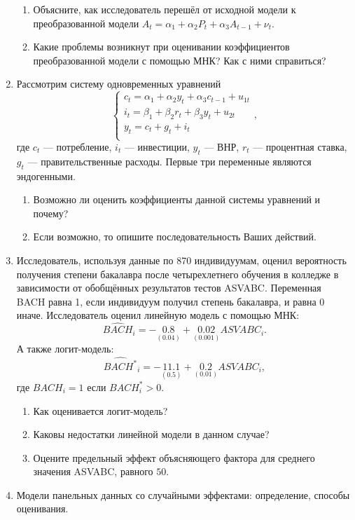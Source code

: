 \documentclass[12pt, a4paper]{article}
\theoremstyle{definition}
\begin{document}
\begin{enumerate}
\begin{enumerate}
\item Объясните, как исследователь перешёл от исходной модели к преобразованной модели $A_t = \alpha_1 + \alpha_2 P_t + \alpha_3 A_{t-1} + \nu_t$.
\item Какие проблемы возникнут при оценивании коэффициентов преобразованной модели с помощью МНК? Как с ними справиться?
\end{enumerate}



\item Рассмотрим систему одновременных уравнений
\[
    \begin{cases}
    c_t = \alpha_1 + \alpha_2 y_t + \alpha_3 c_{t-1} + u_{1t} \\
    i_t = \beta_1 + \beta_2 r_t + \beta_3 y_t + u_{2t} \\
    y_t = c_t + g_t + i_t \\
    \end{cases},
\]
где  $c_t$ — потребление, $i_t$ — инвестиции, $y_t$ — ВНР, $r_t$ — процентная ставка, $g_t$ — правительственные расходы. Первые три переменные являются эндогенными.

\begin{enumerate}
\item Возможно ли оценить коэффициенты данной системы уравнений и почему?
\item Если возможно, то опишите последовательность Ваших действий.
\end{enumerate}



\item Исследователь, используя данные по 870 индивидуумам, оценил вероятность получения степени бакалавра после четырехлетнего обучения в колледже в зависимости от обобщённых результатов тестов ASVABC. Переменная BACH равна 1, если индивидуум получил степень бакалавра, и равна 0 иначе. Исследователь оценил линейную модель с помощью МНК:
\[
\widehat{BACH}_i = -\underset{(0.04)}{0.8} + \underset{(0.001)}{0.02}ASVABC_i.
\]
А также логит-модель:
\[
\widehat{BACH^*}_i =  -\underset{(0.5)}{11.1} + \underset{(0.01)}{0.2}ASVABC_i,
\]
где $BACH_i=1$ если $BACH^*_i > 0$.

\begin{enumerate}
\item Как оценивается логит-модель?
\item Каковы недостатки линейной модели в данном случае?
\item Оцените предельный эффект объясняющего фактора для среднего значения ASVABC, равного $50$.
\end{enumerate}


\item Модели панельных данных со случайными эффектами: определение, способы оценивания.

\end{enumerate}
\end{document}

